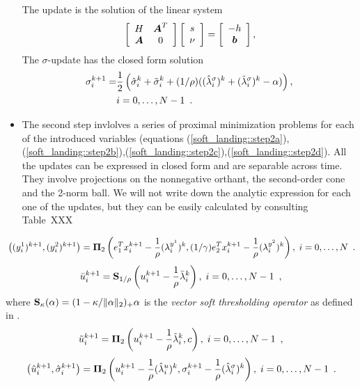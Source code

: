 \documentclass[openany]{now}
\newcommand{\proj}{\mathcal{\bf \Pi}}
\newcommand{\soft}{\mathcal{\bf S}}
\begin{document}
\begin{itemize}
The update is the solution of the linear system
\begin{equation}{\label{soft_landing::step1a}}
\left[\begin{array}{cc}
H &\boldsymbol{A}^T \\
\boldsymbol{A} & 0
\end{array}\right]
\left[\begin{array}{c}
s \\ \nu
\end{array}\right] = 
\left[
\begin{array}{c}
-h \\ \boldsymbol{b}
\end{array}
\right],
\end{equation}
The $\sigma$-update has the closed form solution
\begin{align}{\label{soft_landing::step1b}}
\sigma_i^{k+1} = \nonumber &\frac{1}{2}\left(\hat{\sigma}_i^k+\tilde{\sigma}_i^k + (1/\rho)((\hat{\lambda}^{\sigma}_i)^k+(\tilde{\lambda}^{\sigma}_i)^k-\alpha)\right),\\
                           &i = 0,\ldots,N-1\enspace.
\end{align}

\item The second step invlolves a series of proximal minimization problems for each of the introduced variables (equations (\ref{soft_landing::step2a}),(\ref{soft_landing::step2b}),(\ref{soft_landing::step2c}),(\ref{soft_landing::step2d}). All the updates can be expressed in closed form and are separable across time. They involve projections on the nonnegative orthant, the second-order cone and the 2-norm ball. We will not write down the analytic expression for each one of the updates, but they can be easily calculated by consulting Table~XXX
\end{itemize}

\iffalse
\begin{equation}{\label{soft_landing::step2a}}
\left((y_i^1)^{k+1},(y_i^2)^{k+1}\right) = \proj{_2}\left(e_1^Tx_i^{k+1} - \frac{1}{\rho}(\lambda_i^{y^1})^k, (1/\gamma)e_2^Tx_i^{k+1} - \frac{1}{\rho}(\lambda_i^{y^2})^k\right),\; i = 0,\ldots,N\enspace.
\end{equation}
\begin{equation}{\label{soft_landing::step2b}}
\bar{u}_i^{k+1} = \soft{_{1/\rho}}\left(u_i^{k+1} - \frac{1}{\rho}\bar{\lambda}_i^k\right),\; i = 0,\ldots,N-1\enspace,
\end{equation}
where $\soft_{\kappa}(\alpha) = (1-\kappa/\|\alpha\|_2)_+\alpha$ is the \emph{vector soft thresholding operator} as defined in \cite[Section~6.5]{admm_distr_stats}.
\begin{equation}{\label{soft_landing::step2c}}
\tilde{u}_i^{k+1} =  \proj{_2}\left(u_i^{k+1} - \frac{1}{\rho}\tilde{\lambda}_i^k, c\right),\; i = 0,\ldots,N-1\enspace,
\end{equation}
\begin{equation}{\label{soft_landing::step2d}}
\left(\hat{u}_i^{k+1},\hat{\sigma}_i^{k+1}\right) = \proj{_2}\left(u_i^{k+1} - \frac{1}{\rho}(\hat{\lambda}_i^u)^k, \sigma_i^{k+1} - \frac{1}{\rho}(\hat{\lambda}_i^{\sigma})^k\right),\; i = 0,\ldots,N-1\enspace.
\end{equation}
\end{document}

